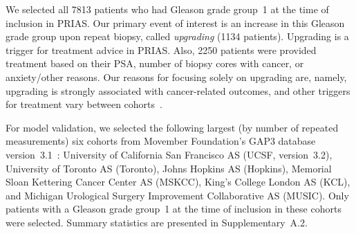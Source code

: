 We selected all 7813 patients who had Gleason grade group~1 at the time of inclusion in PRIAS. Our primary event of interest is an increase in this Gleason grade group upon repeat biopsy, called \textit{upgrading} (1134 patients). Upgrading is a trigger for treatment advice in PRIAS. Also, 2250 patients were provided treatment based on their PSA, number of biopsy cores with cancer, or anxiety/other reasons. Our reasons for focusing solely on upgrading are, namely, upgrading is strongly associated with cancer-related outcomes, and other triggers for treatment vary between cohorts~\citep{nieboer2018active}.

For model validation, we selected the following largest (by number of repeated measurements) six cohorts from Movember Foundation's GAP3 database version~3.1~\citep{gap3_2018}: University of California San Francisco AS (UCSF, version~3.2), University of Toronto AS (Toronto), Johns Hopkins AS (Hopkins), Memorial Sloan Kettering Cancer Center AS (MSKCC), King's College London AS (KCL), and Michigan Urological Surgery Improvement Collaborative AS (MUSIC). Only patients with a Gleason grade group~1 at the time of inclusion in these cohorts were selected. Summary statistics are presented in Supplementary~A.2.